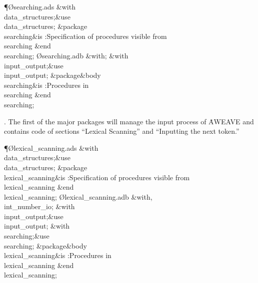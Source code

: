 \Y\P\O{searching.ads}\?\6
\?\&{with}\8\\{data\_structures};\8\&{use}\8\\{data\_structures};\6
\&{package}\8\1\\{searching}\2\8\&{is}\8\1\6
:Specification of procedures visible from \\{searching}\X\2\6
\&{end}\8\\{searching};\7
\O{searching.adb}\?\6
\?\&{with}\8;\6
\&{with}\8\\{input\_output};\8\&{use}\8\\{input\_output};\6
\&{package}\8\1\&{body}\8\\{searching}\2\8\&{is}\8\1\6
:Procedures in \\{searching}\X\2\6
\&{end}\8\\{searching};\par
\fi

\*. The first of the major packages will manage the input process of
\.{AWEAVE} and contains code of sections ``Lexical Scanning''
and ``Inputting the next token.''

\Y\P\O{lexical\_scanning.ads}\?\6
\?\&{with}\8\\{data\_structures};\8\&{use}\8\\{data\_structures};\6
\&{package}\8\1\\{lexical\_scanning}\2\8\&{is}\8\1\6
:Specification of procedures visible from \\{lexical\_scanning}\X\2\6
\&{end}\8\\{lexical\_scanning};\7
\O{lexical\_scanning.adb}\?\6
\?\&{with}\8\?,\?\\{int\_number\_io};\6
\&{with}\8\\{input\_output};\8\&{use}\8\\{input\_output};\6
\&{with}\8\\{searching};\8\&{use}\8\\{searching};\6
\&{package}\8\1\&{body}\8\\{lexical\_scanning}\2\8\&{is}\8\1\6
:Procedures in \\{lexical\_scanning}\X\2\6
\&{end}\8\\{lexical\_scanning};\par
\fi

